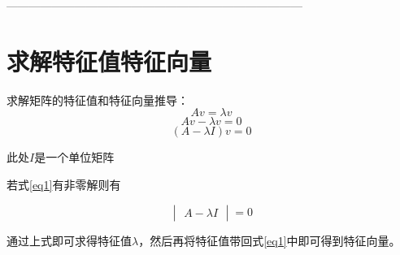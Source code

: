 \documentclass[12pt, a4paper, oneside]{ctexbook}
\begin{document}
------------------------------------------------------------------------------
\section{求解特征值特征向量}

求解矩阵的特征值和特征向量推导：
\begin{equation}
    Av=\lambda v
\end{equation}
\begin{equation} 
    Av-\lambda v=0
\end{equation}
\begin{equation}\label{eq1}
    (A-\lambda I)v=0
\end{equation}

此处$I$是一个单位矩阵

若式\ref{eq1}有非零解则有

$$
\begin{vmatrix}
    A-\lambda I
\end{vmatrix}
=0
$$

通过上式即可求得特征值$\lambda$，然后再将特征值带回式\ref{eq1}中即可得到特征向量。
\end{document}
